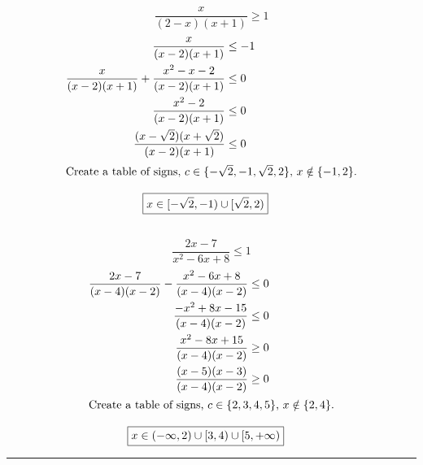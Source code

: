 	\subsection{}
		\[\frac{x}{(2 - x)(x + 1)} \geq 1\]
		\begin{align*}
			\frac{x}{(x - 2)(x + 1)} &\leq -1 \\
			\frac{x}{(x - 2)(x + 1)} + \frac{x^2 - x - 2}{(x - 2)(x + 1)} &\leq 0 \\
			\frac{x^2 - 2}{(x - 2)(x + 1)} &\leq 0 \\
			\frac{(x - \sqrt{2})(x + \sqrt{2})}{(x - 2)(x + 1)} &\leq 0 \\
			\intertext{Create a table of signs, $c \in \{-\sqrt{2}, -1, \sqrt{2}, 2\}$, $x \notin \{-1, 2\}$.}
		\end{align*}
		\begin{center}\end{center}
		\begin{align*}
			\Aboxed{x &\in [-\sqrt{2}, -1) \cup [\sqrt{2}, 2)}
		\end{align*}
		\pagebreak{}

	\subsection{}
		\[\frac{2x - 7}{x^2 - 6x + 8} \leq 1\]
		\begin{align*}
			\frac{2x - 7}{(x - 4)(x - 2)} - \frac{x^2 - 6x + 8}{(x - 4)(x - 2)} &\leq 0 \\
			\frac{-x^2 + 8x - 15}{(x - 4)(x - 2)} &\leq 0 \\
			\frac{x^2 - 8x + 15}{(x - 4)(x - 2)} &\geq 0 \\
			\frac{(x - 5)(x - 3)}{(x - 4)(x - 2)} &\geq 0 \\
			\intertext{Create a table of signs, $c \in \{2, 3, 4, 5\}$, $x \notin \{2, 4\}$.}
		\end{align*}
		\begin{center}\end{center}
		\begin{align*}
			\Aboxed{x &\in (-\infty, 2) \cup [3, 4) \cup [5, +\infty)}
		\end{align*}
		\hrule{}


